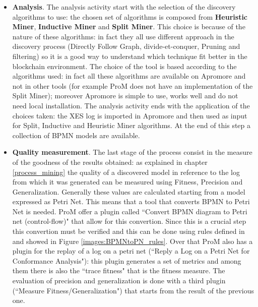 \begin{itemize}
    \item \textbf{Analysis}. The analysis activity start with the selection of the discovery algorithms to use: the chosen set 
    of algorithms is composed from \textbf{Heuristic Miner}, \textbf{Inductive Miner} and \textbf{Split Miner}. This choice is 
    because of the nature of these algorithms: in fact they all use different approach in the discovery process (Directly 
    Follow Graph, divide-et-conquer, Pruning and filtering) so it is a good way to understand which technique fit better in the 
    blockchain environment.
    The choice of the tool is based according to the algorithms used: in fact all these algorithms are available on Apromore and 
    not in other tools (for example ProM does not have an implementation of the Split Miner); moreover Apromore is simple to use, 
    works well and do not need local installation. The analysis activity ends with the application of the choices taken: the XES 
    log is imported in Apromore and then used as input for Split, Inductive and Heuristic Miner algorithms. At the end of this 
    step a collection of BPMN models are available.
    
    \item \textbf{Quality measurement}. The last stage of the process consist in the measure of the goodness of the results 
    obtained: as explained in chapter \ref{process_mining} the quality of a discovered model in reference to the log from which 
    it was generated can be measured using Fitness, Precision and Generalization.
    Generally these values are calculated starting from a model expressed as Petri Net. This means that a tool that converts 
    BPMN to Petri Net is needed. ProM offer a plugin called ``Convert BPMN diagram to Petri net (control-flow)" that allow for 
    this convertion. Since this is a crucial step this convertion must be verified and this can be done using rules defined in 
    \cite{DBLP:journals/BPMNtoPN} and showed in Figure \ref{images:BPMNtoPN_rules}.
    Over that ProM also has a plugin for the replay of a log on a petri net (``Reply a Log on a Petri Net for Conformance 
    Analysis"): this plugin generates a set of metrics and among them there is also the ``trace fitness" that is the fitness 
    measure. The evaluation of precision and generalization is done with a third plugin (``Measure Fitness/Generalization") that 
    starts from the result of the previous one.
    
\end{itemize}

